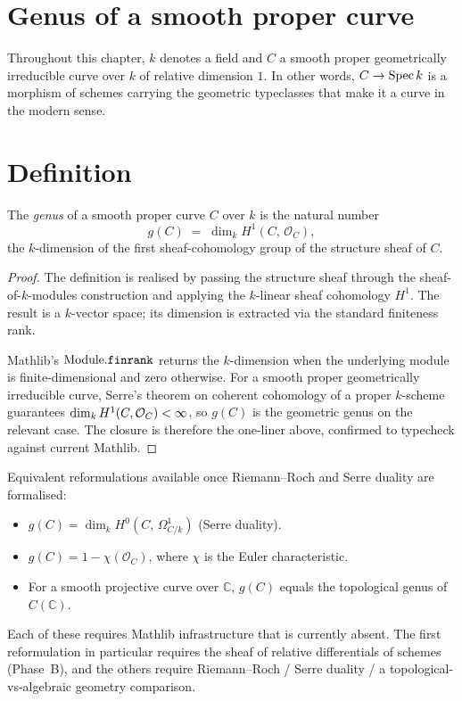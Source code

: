 \section{Genus of a smooth proper curve}
\label{mk-chap:Genus}

Throughout this chapter, \(k\) denotes a field and \(C\) a smooth proper geometrically irreducible curve over \(k\) of relative dimension \(1\). In other words, \(C \to \operatorname{Spec} k\) is a morphism of schemes carrying the geometric typeclasses that make it a curve in the modern sense.

\section{Definition}
\begin{definition}\label{mk-def:genus}
  \leanok


  The \emph{genus} of a smooth proper curve \(C\) over \(k\) is the natural number
  \[
    g(C) \;=\; \dim_k H^1(C,\, \mathcal O_C),
  \]
  the \(k\)-dimension of the first sheaf-cohomology group of the structure sheaf of \(C\).
\end{definition}

\begin{proof}

  The definition is realised by passing the structure sheaf through the sheaf-of-\(k\)-modules construction and applying the \(k\)-linear sheaf cohomology \(H^1\). The result is a \(k\)-vector space; its dimension is extracted via the standard finiteness rank.

  Mathlib's \(\mathrm{Module}.\mathtt{finrank}\) returns the \(k\)-dimension when the underlying module is finite-dimensional and zero otherwise. For a smooth proper geometrically irreducible curve, Serre's theorem on coherent cohomology of a proper \(k\)-scheme guarantees \(\dim_k H^1(C, \mathcal{O}_{C}) < \infty\), so \(g(C)\) is the geometric genus on the relevant case. The closure is therefore the one-liner above, confirmed to typecheck against current Mathlib.
\end{proof}

Equivalent reformulations available once Riemann--Roch and Serre duality are formalised:
\begin{itemize}
  \item \(g(C) = \dim_k H^0(C,\, \Omega^1_{C/k})\) (Serre duality).
  \item \(g(C) = 1 - \chi(\mathcal O_C)\), where \(\chi\) is the Euler characteristic.
  \item For a smooth projective curve over \(\mathbb C\), \(g(C)\) equals the topological genus of \(C(\mathbb C)\).
\end{itemize}
Each of these requires Mathlib infrastructure that is currently absent. The first reformulation in particular requires the sheaf of relative differentials of schemes (Phase~B), and the others require Riemann--Roch / Serre duality / a topological-vs-algebraic geometry comparison.
